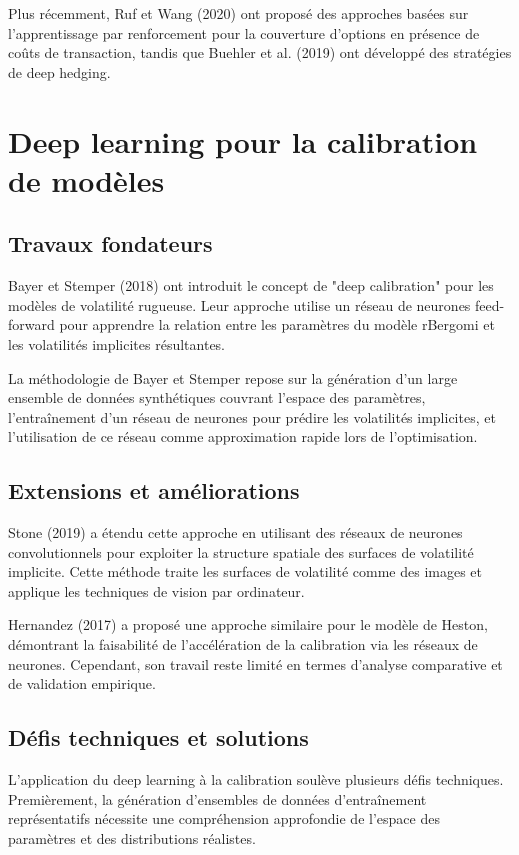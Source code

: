 Plus récemment, Ruf et Wang (2020) ont proposé des approches basées sur l'apprentissage par renforcement pour la couverture d'options en présence de coûts de transaction, tandis que Buehler et al. (2019) ont développé des stratégies de deep hedging.

\section{Deep learning pour la calibration de modèles}

\subsection{Travaux fondateurs}

Bayer et Stemper (2018) ont introduit le concept de "deep calibration" pour les modèles de volatilité rugueuse. Leur approche utilise un réseau de neurones feed-forward pour apprendre la relation entre les paramètres du modèle rBergomi et les volatilités implicites résultantes.

La méthodologie de Bayer et Stemper repose sur la génération d'un large ensemble de données synthétiques couvrant l'espace des paramètres, l'entraînement d'un réseau de neurones pour prédire les volatilités implicites, et l'utilisation de ce réseau comme approximation rapide lors de l'optimisation.

\subsection{Extensions et améliorations}

Stone (2019) a étendu cette approche en utilisant des réseaux de neurones convolutionnels pour exploiter la structure spatiale des surfaces de volatilité implicite. Cette méthode traite les surfaces de volatilité comme des images et applique les techniques de vision par ordinateur.

Hernandez (2017) a proposé une approche similaire pour le modèle de Heston, démontrant la faisabilité de l'accélération de la calibration via les réseaux de neurones. Cependant, son travail reste limité en termes d'analyse comparative et de validation empirique.

\subsection{Défis techniques et solutions}

L'application du deep learning à la calibration soulève plusieurs défis techniques. Premièrement, la génération d'ensembles de données d'entraînement représentatifs nécessite une compréhension approfondie de l'espace des paramètres et des distributions réalistes.

